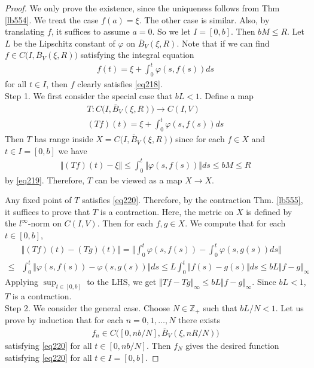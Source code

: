 \documentclass[12pt,b5paper,notitlepage]{article}
\theoremstyle{definition}
\theoremstyle{plain}
\newcommand{\ovl}{\overline}
\newcommand{\Zbb}{\mathbb Z}
\numberwithin{equation}{section}
\begin{document}
\begin{proof}
We only prove the existence, since the uniqueness follows from Thm \ref{lb554}. We treat the case $f(a)=\xi$. The other case is similar. Also, by translating $f$, it suffices to assume $a=0$. So we let $I=[0,b]$. Then $bM\leq R$. Let $L$ be the Lipschitz constant of $\varphi$ on $\ovl B_V(\xi,R)$. Note that if we can find $f\in C\big(I,\ovl B_V(\xi,R)\big)$ satisfying the integral equation
\begin{align}
f(t)=\xi+\int_0^t \varphi(s,f(s))ds  \label{eq220}
\end{align}
for all $t\in I$, then $f$ clearly satisfies \eqref{eq218}.\\[-1ex]

Step 1. We first consider the special case that $bL<1$. Define a map
\begin{gather*}
T:C\big(I,\ovl B_V(\xi,R)\big)\rightarrow C(I,V)\\
(Tf)(t)=\xi+\int_0^t\varphi(s,f(s))ds
\end{gather*}
Then $T$ has range inside $X=C\big(I,\ovl B_V(\xi,R)\big)$ since for each $f\in X$ and $t\in I=[0,b]$ we have
\begin{align}
\Vert (Tf)(t)-\xi\Vert\leq \int_0^t\Vert\varphi(s,f(s))\Vert ds\leq bM\leq R
\end{align}
by \eqref{eq219}. Therefore, $T$ can be viewed as a map $X\rightarrow X$. 

Any fixed point of $T$ satisfies \eqref{eq220}. Therefore, by the contraction Thm. \ref{lb555}, it suffices to prove that $T$ is a contraction. Here, the metric on $X$ is defined by the $l^\infty$-norm on $C(I,V)$. Then for each $f,g\in X$. We compute that for each $t\in[0,b]$,
\begin{align*}
&\Vert (Tf)(t)-(Tg)(t)\Vert=\Big\Vert\int_0^t \varphi(s,f(s))-\int_0^t\varphi(s,g(s))ds\Big\Vert\\
\leq&\int_0^t\big\Vert\varphi(s,f(s))-\varphi(s,g(s))\big\Vert ds\leq L\int_0^t\big\Vert f(s)-g(s)\big\Vert ds\leq bL\Vert f-g\Vert_\infty
\end{align*}
Applying $\sup_{t\in[0,b]}$ to the LHS, we get $\Vert Tf-Tg\Vert_\infty\leq bL\Vert f-g\Vert_\infty$. Since $bL<1$, $T$ is a contraction.\\[-1ex]

Step 2. We consider the general case. Choose $N\in\Zbb_+$ such that $bL/N<1$. Let us prove by induction that for each $n=0,1,\dots,N$ there exists
\begin{align*}
f_n\in C\big([0,nb/N],\ovl B_V(\xi,nR/N) \big)
\end{align*}
satisfying \eqref{eq220} for all $t\in[0,nb/N]$. Then $f_N$ gives the desired function satisfying \eqref{eq220} for all $t\in I=[0,b]$.


\end{proof}
\end{document}
